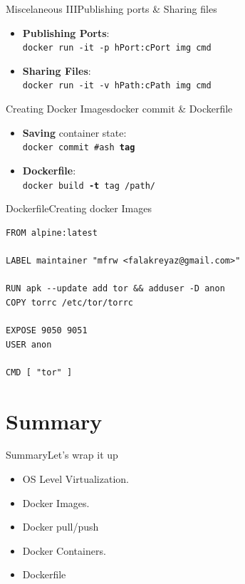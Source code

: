 \documentclass{beamer}
\begin{document}
\begin{frame}{Miscelaneous III}{Publishing ports \& Sharing files}
{\Large 
\begin{itemize}
    \item
    \textbf{Publishing Ports}: \\
    \texttt{docker run -it \alert{-p hPort:cPort} img cmd}\\
    
    \hrulefill
    
    \item \textbf{Sharing Files}: \\
    \texttt{docker run -it \alert{-v hPath:cPath} img cmd}
    
\end{itemize}
}
\end{frame}

\begin{frame}{Creating Docker Images}{docker commit \& Dockerfile}
    {\Large 
    \begin{itemize}
        \item \textbf{Saving}  container state:\\
        \texttt{docker \alert{commit} \#ash \textbf{tag}}\\
        \hrulefill
        \item \textbf{Dockerfile}:\\
        \texttt{docker \alert{build} \textbf{-t} tag /path/}
    \end{itemize}
    }
\end{frame}

\begin{frame}[fragile]{Dockerfile}{Creating docker Images}
\begin{verbatim}
FROM alpine:latest

LABEL maintainer "mfrw <falakreyaz@gmail.com>"

RUN apk --update add tor && adduser -D anon
COPY torrc /etc/tor/torrc

EXPOSE 9050 9051
USER anon

CMD [ "tor" ]
\end{verbatim}
    
\end{frame}

\section*{Summary}

\begin{frame}{Summary}{Let's wrap it up}
{\Large 
\begin{itemize}
\item OS Level Virtualization.
\item Docker Images.
\item Docker pull/push
\item Docker Containers.
\item Dockerfile
\end{itemize}
}

\end{frame}
\end{document}
